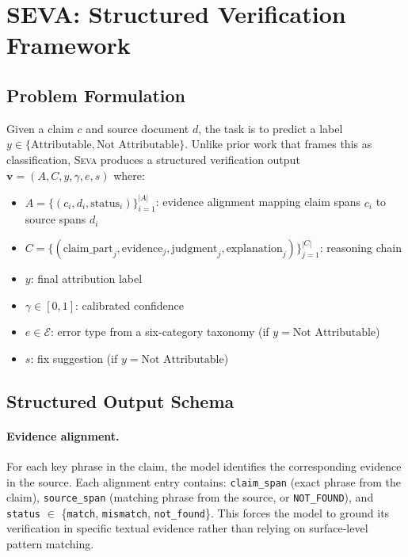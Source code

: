 \documentclass{article}
\newcommand{\seva}{\textsc{Seva}}
\begin{document}
\section{SEVA: Structured Verification Framework}
\label{sec:method}

\subsection{Problem Formulation}

Given a claim $c$ and source document $d$, the task is to predict a label $y \in \{\text{Attributable}, \text{Not Attributable}\}$.
Unlike prior work that frames this as classification, \seva{} produces a structured verification output $\mathbf{v} = (A, C, y, \gamma, e, s)$ where:
\begin{itemize}[nosep,leftmargin=*]
  \item $A = \{(c_i, d_i, \text{status}_i)\}_{i=1}^{|A|}$: evidence alignment mapping claim spans $c_i$ to source spans $d_i$
  \item $C = \{(\text{claim\_part}_j, \text{evidence}_j, \text{judgment}_j, \text{explanation}_j)\}_{j=1}^{|C|}$: reasoning chain
  \item $y$: final attribution label
  \item $\gamma \in [0, 1]$: calibrated confidence
  \item $e \in \mathcal{E}$: error type from a six-category taxonomy (if $y = \text{Not Attributable}$)
  \item $s$: fix suggestion (if $y = \text{Not Attributable}$)
\end{itemize}

\subsection{Structured Output Schema}
\label{sec:format}

\paragraph{Evidence alignment.}
For each key phrase in the claim, the model identifies the corresponding evidence in the source.
Each alignment entry contains: \texttt{claim\_span} (exact phrase from the claim), \texttt{source\_span} (matching phrase from the source, or \texttt{NOT\_FOUND}), and \texttt{status} $\in$ \{\texttt{match}, \texttt{mismatch}, \texttt{not\_found}\}.
This forces the model to ground its verification in specific textual evidence rather than relying on surface-level pattern matching.
\end{document}
